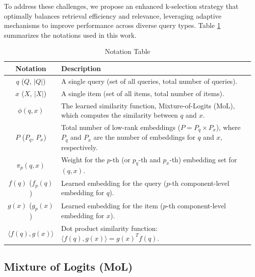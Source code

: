 To address these challenges, we propose an enhanced k-selection strategy that optimally balances retrieval efficiency and relevance, leveraging adaptive mechanisms to improve performance across diverse query types. Table \ref{tab:Notations_table} summarizes the notations used in this work.

\begin{table}[h]
	\centering
	\begin{tabular}{|c|p{13cm}|}  %
		\hline
		\textbf{Notation} & \textbf{Description} \\ \hline
		\( q \) (\( Q \), \( |Q| \)) & A single query (set of all queries, total number of queries). \\ \hline
		\( x \) (\( X \), \( |X| \)) & A single item (set of all items, total number of items). \\ \hline
		\( \phi(q, x) \) & The learned similarity function, Mixture-of-Logits (MoL), which computes the similarity between \( q \) and \( x \). \\ \hline
		\( P \) (\( P_q \), \( P_x \)) & Total number of low-rank embeddings (\( P = P_q \times P_x \)), where \( P_q \) and \( P_x \) are the number of embeddings for \( q \) and \( x \), respectively. \\ \hline
		\( \pi_p(q, x) \)  & Weight for the \( p \)-th (or \( p_q \)-th and \( p_x \)-th) embedding set for \( (q, x) \). \\ \hline
		\( f(q) \) (\( f_p(q) \)) & Learned embedding for the query (\( p \)-th component-level embedding for \( q \)). \\ \hline
		\( g(x) \) (\( g_p(x) \)) & Learned embedding for the item (\( p \)-th component-level embedding for \( x \)). \\ \hline
		\( \langle f(q), g(x) \rangle \) & Dot product similarity function: \( \langle f(q), g(x) \rangle = g(x)^T f(q) \). \\ \hline
	\end{tabular}
	\caption{Notation Table }
	\label{tab:Notations_table}
\end{table}

\newpage
\subsection{Mixture of Logits (MoL)}

